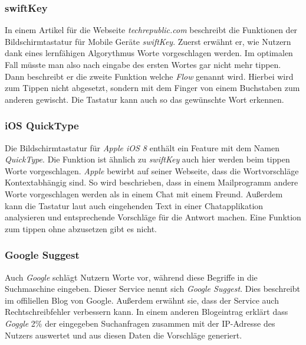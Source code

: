         \subsubsection*{swiftKey}
        	In einem Artikel für die Webseite \emph{techrepublic.com} beschreibt \cite{techrepublic:swiftKey} die Funktionen der Bildschirmtastatur für Mobile Geräte \emph{swiftKey}. Zuerst erwähnt er, wie Nutzern dank eines lernfähigen Algorythmus Worte vorgeschlagen werden. Im optimalen Fall müsste man also nach eingabe des ersten Wortes gar nicht mehr tippen. Dann beschreibt er die zweite Funktion welche \emph{Flow} genannt wird. Hierbei wird zum Tippen nicht abgesetzt, sondern mit dem Finger von einem Buchstaben zum anderen gewischt. Die Tastatur kann auch so das gewünschte Wort erkennen.
        
        \subsubsection*{iOS QuickType}
        
        	Die Bildschirmtastatur für \emph{Apple iOS 8} enthält ein Feature mit dem Namen \emph{QuickType}. Die Funktion ist ähnlich zu \emph{swiftKey} auch hier werden beim tippen Worte vorgeschlagen. \emph{Apple} bewirbt auf seiner Webseite, dass die Wortvorschläge Kontextabhängig sind. So wird beschrieben, dass in einem Mailprogramm andere Worte vorgeschlagen werden als in einem Chat mit einem Freund. Außerdem kann die Tastatur laut \cite{apple:quickType} auch eingehenden Text in einer Chatapplikation analysieren und entsprechende Vorschläge für die Antwort machen. Eine Funktion zum tippen ohne abzusetzen gibt es nicht.
        
        \subsubsection*{Google Suggest}
        
        	Auch \emph{Google} schlägt Nutzern Worte vor, während diese Begriffe in die Suchmaschine eingeben. Dieser Service nennt sich \emph{Google Suggest}. Dies beschreibt \cite{google:suggestIntro} im offiliellen Blog von Google. Außerdem erwähnt sie, dass der Service auch Rechtschreibfehler verbessern kann. In einem anderen Blogeintrag erklärt \cite{google:suggestUpdate} dass \emph{Goggle} 2\% der eingegeben Suchanfragen zusammen mit der IP-Adresse des Nutzers auswertet und aus diesen Daten die Vorschläge generiert.
    
    
    
    \newpage